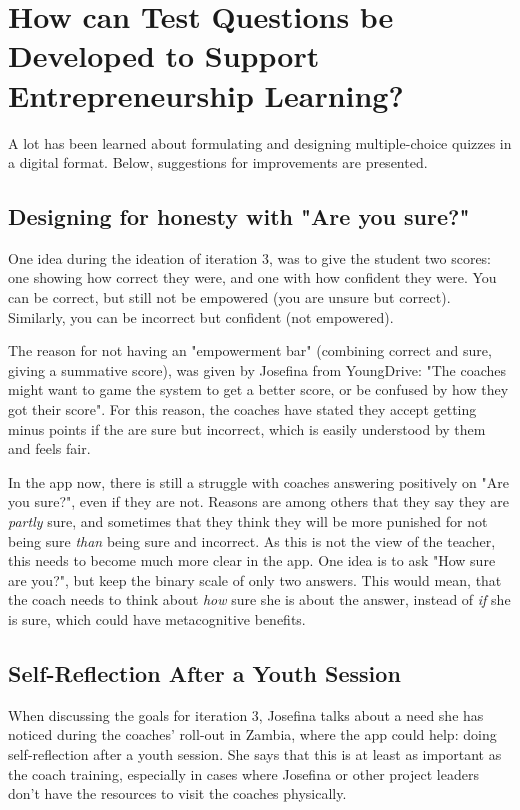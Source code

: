 \section{How can Test Questions be Developed to Support Entrepreneurship Learning?}

A lot has been learned about formulating and designing multiple-choice quizzes in a digital format. Below, suggestions for improvements are presented.

\subsection{Designing for honesty with "Are you sure?"}


One idea during the ideation of iteration 3, was to give the student two scores: one showing how correct they were, and one with how confident they were. You can be correct, but still not be empowered (you are unsure but correct). Similarly, you can be incorrect but confident (not empowered).

The reason for not having an "empowerment bar" (combining correct and sure, giving a summative score), was given by Josefina from YoungDrive: "The coaches might want to game the system to get a better score, or be confused by how they got their score". For this reason, the coaches have stated they accept getting minus points if the are sure but incorrect, which is easily understood by them and feels fair.

In the app now, there is still a struggle with coaches answering positively on "Are you sure?", even if they are not. Reasons are among others that they say they are \textit{partly} sure, and sometimes that they think they will be more punished for not being sure \textit{than} being sure and incorrect. As this is not the view of the teacher, this needs to become much more clear in the app. One idea is to ask "How sure are you?", but keep the binary scale of only two answers. This would mean, that the coach needs to think about \textit{how} sure she is about the answer, instead of \textit{if} she is sure, which could have metacognitive benefits.

\subsection{Self-Reflection After a Youth Session}
When discussing the goals for iteration 3, Josefina talks about a need she has noticed during the coaches' roll-out in Zambia, where the app could help: doing self-reflection after a youth session. She says that this is at least as important as the coach training, especially in cases where Josefina or other project leaders don't have the resources to visit the coaches physically.

